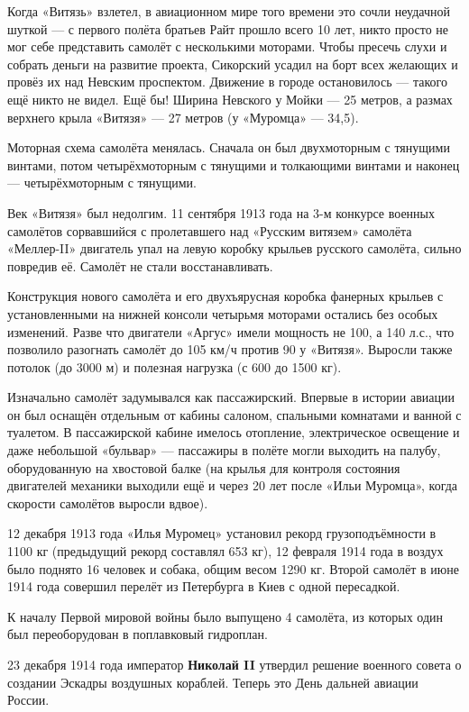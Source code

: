Когда «Витязь» взлетел, в авиационном мире того времени это сочли неудачной
шуткой — с первого полёта братьев Райт прошло всего 10 лет, никто просто не мог
себе представить самолёт с несколькими моторами. Чтобы пресечь слухи и собрать
деньги на развитие проекта, Сикорский усадил на борт всех желающих и провёз их
над Невским проспектом. Движение в городе остановилось — такого ещё никто не
видел. Ещё бы! Ширина Невского у Мойки — 25 метров, а размах верхнего крыла
«Витязя» — 27 метров (у «Муромца» — 34,5).

Моторная схема самолёта менялась. Сначала он был двухмоторным с тянущими
винтами, потом четырёхмоторным с тянущими и толкающими винтами и наконец —
четырёхмоторным с тянущими.

Век «Витязя» был недолгим. 11 сентября 1913 года на 3-м конкурсе военных
самолётов сорвавшийся с пролетавшего над «Русским витязем» самолёта «Меллер-II»
двигатель упал на левую коробку крыльев русского самолёта, сильно повредив её.
Самолёт не стали восстанавливать.

Конструкция нового самолёта и его двухъярусная коробка фанерных крыльев с
установленными на нижней консоли четырьмя моторами остались без особых
изменений. Разве что двигатели «Аргус» имели мощность не 100, а 140 л.с., что
позволило разогнать самолёт до 105 км/ч против 90 у «Витязя». Выросли также
потолок (до 3000 м) и полезная нагрузка (с 600 до 1500 кг).

Изначально самолёт задумывался как пассажирский. Впервые в истории авиации он
был оснащён отдельным от кабины салоном, спальными комнатами и ванной с
туалетом. В пассажирской кабине имелось отопление, электрическое освещение и
даже небольшой «бульвар» — пассажиры в полёте могли выходить на палубу,
оборудованную на хвостовой балке (на крылья для контроля состояния двигателей
механики выходили ещё и через 20 лет после «Ильи Муромца», когда скорости
самолётов выросли вдвое).

12 декабря 1913 года «Илья Муромец» установил рекорд грузоподъёмности в 1100 кг
(предыдущий рекорд составлял 653 кг), 12 февраля 1914 года в воздух было
поднято 16 человек и собака, общим весом 1290 кг. Второй самолёт в июне 1914
года совершил перелёт из Петербурга в Киев с одной пересадкой.

К началу Первой мировой войны было выпущено 4 самолёта, из которых один был
переоборудован в поплавковый гидроплан.

23 декабря 1914 года император \textbf{Николай II} утвердил решение военного совета о
создании Эскадры воздушных кораблей. Теперь это День дальней авиации России.

